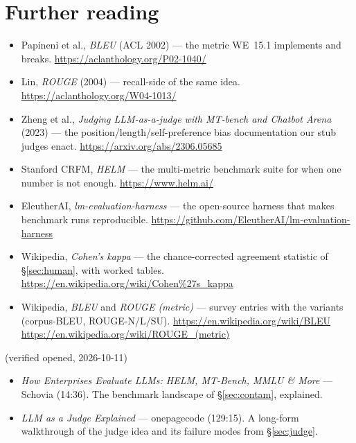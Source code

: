 \section*{Further reading}
\label{sec:further15}
\begin{itemize}
\item Papineni et al., \emph{BLEU} (ACL 2002) --- the metric WE~15.1
implements and breaks. \url{https://aclanthology.org/P02-1040/}
\item Lin, \emph{ROUGE} (2004) --- recall-side of the same idea.
\url{https://aclanthology.org/W04-1013/}
\item Zheng et al., \emph{Judging LLM-as-a-judge with MT-bench and
Chatbot Arena} (2023) --- the position/length/self-preference bias
documentation our stub judges enact.
\url{https://arxiv.org/abs/2306.05685}
\item Stanford CRFM, \emph{HELM} --- the multi-metric benchmark
suite for when one number is not enough. \url{https://www.helm.ai/}
\item EleutherAI, \emph{lm-evaluation-harness} --- the open-source
harness that makes benchmark runs reproducible.
\url{https://github.com/EleutherAI/lm-evaluation-harness}
\item Wikipedia, \emph{Cohen's kappa} --- the chance-corrected
agreement statistic of \S\ref{sec:human}, with worked tables.
\url{https://en.wikipedia.org/wiki/Cohen%27s_kappa}
\item Wikipedia, \emph{BLEU} and \emph{ROUGE (metric)} --- survey
entries with the variants (corpus-BLEU, ROUGE-N/L/SU).
\url{https://en.wikipedia.org/wiki/BLEU}
\url{https://en.wikipedia.org/wiki/ROUGE_(metric)}
\end{itemize}

\begin{rulebox}
(verified opened, 2026-10-11)
\begin{itemize}
\item \emph{How Enterprises Evaluate LLMs: HELM, MT-Bench, MMLU \&
More} --- Schovia (14:36). The benchmark landscape of
\S\ref{sec:contam}, explained.
\item \emph{LLM as a Judge Explained} --- onepagecode (129:15). A
long-form walkthrough of the judge idea and its failure modes from
\S\ref{sec:judge}.
\end{itemize}
\end{rulebox}

